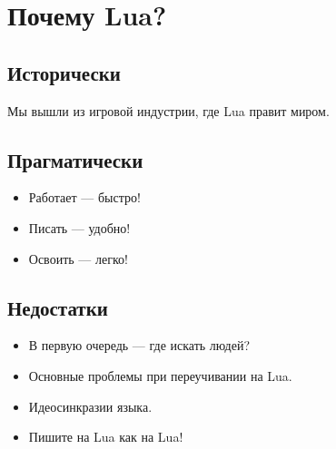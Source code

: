 \documentclass[aspectratio=169,handout]{beamer}
\begin{document}
\section{Почему Lua?}


\subsection*{Исторически}

\begin{frame}
  Мы вышли из игровой индустрии, где Lua правит миром.
\end{frame}


\subsection*{Прагматически}

\begin{frame}
  \begin{itemize}
    \item Работает — быстро!
    \item Писать — удобно!
    \item Освоить — легко!
  \end{itemize}
\end{frame}


\subsection*{Недостатки}

\begin{frame}
  \begin{itemize}
    \item В первую очередь — где искать людей?
    \item Основные проблемы при переучивании на Lua.
    \item Идеосинкразии языка.
    \item Пишите на Lua как на Lua!
  \end{itemize}
\end{frame}

\end{document}

